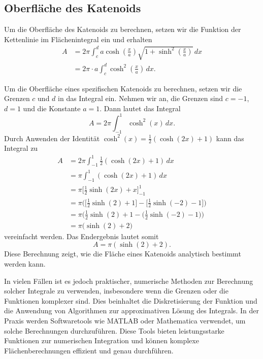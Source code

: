 \subsection{Oberfläche des Katenoids
	\label{Das Katenoid:subsection:Oberfläche des Katenoids}}
Um die Oberfläche des Katenoids zu berechnen, setzen wir die Funktion der Kettenlinie im Flächenintegral ein und erhalten 
%
\begin{align}
	A &= 2\pi \int_{c}^{d} a \cosh \left( \frac{x}{a} \right) \sqrt{1 + \sinh^2 \left( \frac{x}{a} \right)} \,dx \\
	&= 2\pi \cdot a \int_{c}^{d} \cosh^2 \left( \frac{x}{a} \right) \,dx.
\end{align}
\begin{beispiel}
Um die Oberfläche eines spezifischen Katenoids zu berechnen, setzen wir die Grenzen $c$ und $d$ in das Integral ein.
Nehmen wir an, die Grenzen sind $c =-1$, $d=1$ und die Konstante $a=1$.
Dann lautet das Integral	
\[
A = 2\pi \int_{-1}^{1} \cosh^2 (x) \, dx.
\]
%
Durch Anwenden der Identität \(\cosh^2 (x) = \frac{1}{2} (\cosh (2x) + 1)\) kann das Integral zu 
\begin{align*}
	A &= 2\pi \int_{-1}^{1} \frac{1}{2} (\cosh (2x) + 1) \, dx \\
	&= \pi \int_{-1}^{1} (\cosh (2x) + 1) \,dx \\
	&= \pi \biggl[ \frac{1}{2} \sinh (2x) + x \biggr]_{-1}^{1} \\
	&= \pi \biggl( \biggl[ \frac{1}{2} \sinh (2) + 1 \biggr] - \biggl[ \frac{1}{2} \sinh (-2) - 1 \biggr] \biggr) \\
	&= \pi \biggl( \frac{1}{2} \sinh (2) + 1 - \biggl( \frac{1}{2} \sinh (-2) - 1 \biggr) \biggr) \\
	&= \pi \biggl( \sinh (2) + 2 \biggr)
\end{align*}
%
vereinfacht werden. Das Endergebnis lautet somit
\[
A = \pi (\sinh (2) + 2).
\]
Diese Berechnung zeigt, wie die Fläche eines Katenoids analytisch bestimmt werden kann.
\end{beispiel}
In vielen Fällen ist es jedoch praktischer, numerische Methoden zur Berechnung solcher Integrale zu verwenden, insbesondere wenn die Grenzen oder die Funktionen komplexer sind.
Dies beinhaltet die Diskretisierung der Funktion und die Anwendung von Algorithmen zur approximativen Lösung des Integrals.
%
In der Praxis werden Softwaretools wie MATLAB oder Mathematica verwendet, um solche Berechnungen durchzuführen.
%
%
Diese Tools bieten leistungsstarke Funktionen zur numerischen Integration und können komplexe Flächenberechnungen effizient und genau durchführen.

